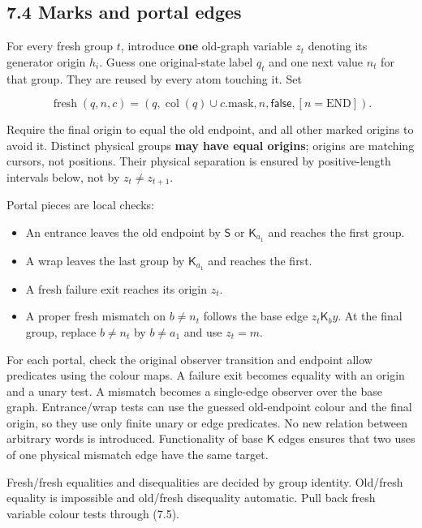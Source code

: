 \documentclass[
  11pt,
  a4paper,
]{article}
\providecommand{\tightlist}{%
  \setlength{\itemsep}{0pt}\setlength{\parskip}{0pt}}
\begin{document}
\subsection{7.4 Marks and portal edges}\label{marks-and-portal-edges}

For every fresh group \(t\), introduce \textbf{one} old-graph variable
\(z_t\) denoting its generator origin \(h_i\). Guess one original-state
label \(q_t\) and one next value \(n_t\) for that group. They are reused
by every atom touching it. Set

\[\operatorname{fresh}(q,n,c)
=(q,\operatorname{col}(q)\cup c.\mathrm{mask},n,
\mathsf{false},[n=\mathrm{END}]).\tag{7.5}\]

Require the final origin to equal the old endpoint, and all other marked
origins to avoid it. Distinct physical groups \textbf{may have equal
origins}; origins are matching cursors, not positions. Their physical
separation is ensured by positive-length intervals below, not by
\(z_t\ne z_{t+1}\).

Portal pieces are local checks:

\begin{itemize}
\tightlist
\item
  An entrance leaves the old endpoint by \(\mathsf S\) or
  \(\mathsf K_{a_1}\) and reaches the first group.
\item
  A wrap leaves the last group by \(\mathsf K_{a_1}\) and reaches the
  first.
\item
  A fresh failure exit reaches its origin \(z_t\).
\item
  A proper fresh mismatch on \(b\ne n_t\) follows the base edge
  \(z_t\mathrel{\mathsf K_b}y\). At the final group, replace
  \(b\ne n_t\) by \(b\ne a_1\) and use \(z_t=m\).
\end{itemize}

For each portal, check the original observer transition and endpoint
allow predicates using the colour maps. A failure exit becomes equality
with an origin and a unary test. A mismatch becomes a single-edge
observer over the base graph. Entrance/wrap tests can use the guessed
old-endpoint colour and the final origin, so they use only finite unary
or edge predicates. No new relation between arbitrary words is
introduced. Functionality of base \(\mathsf K\) edges ensures that two
uses of one physical mismatch edge have the same target.

Fresh/fresh equalities and disequalities are decided by group identity.
Old/fresh equality is impossible and old/fresh disequality automatic.
Pull back fresh variable colour tests through (7.5).
\end{document}
